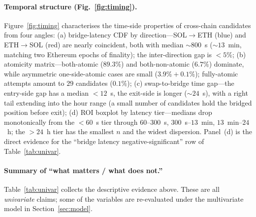 \documentclass[sigconf,nonacm,10pt]{acmart}
\begin{document}
\paragraph{Temporal structure (Fig.~\ref{fig:timing}).}
Figure~\ref{fig:timing} characterises the time-side properties of
cross-chain candidates from four angles:
(a) bridge-latency CDF by direction---SOL$\to$ETH (blue) and
ETH$\to$SOL (red) are nearly coincident, both with median
$\sim\!800$~s ($\sim\!13$~min, matching two Ethereum epochs of
finality); the inter-direction gap is $<\!5\%$;
(b) atomicity matrix---both-atomic ($89.3\%$) and both-non-atomic
($6.7\%$) dominate, while asymmetric one-side-atomic cases are
small ($3.9\%+0.1\%$); fully-atomic attempts amount to $29$
candidates ($0.1\%$);
(c) swap-to-bridge time gap---the entry-side gap has a median
$<\!12$~s, the exit-side is longer ($\sim\!24$~s), with a right tail
extending into the hour range (a small number of candidates hold the
bridged position before exit);
(d) ROI boxplot by latency tier---medians drop monotonically from
the $<\!60$~s tier through $60$--$300$~s, $300$~s--$13$~min,
$13$~min--$24$~h; the $>\!24$~h tier has the smallest $n$ and the
widest dispersion. Panel~(d) is the direct evidence for the
``bridge latency negative-significant'' row of
Table~\ref{tab:univar}.

\paragraph{Summary of ``what matters / what does not.''}
Table~\ref{tab:univar} collects the descriptive evidence above. These
are all \emph{univariate} claims; some of the variables are
re-evaluated under the multivariate model in
Section~\ref{sec:model}.
\end{document}
